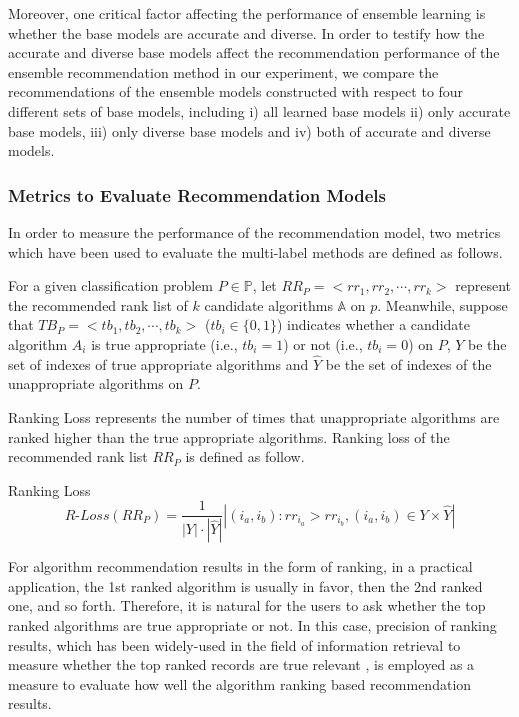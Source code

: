 \documentclass[acmsmall]{acmart}
\begin{document}
Moreover, one critical factor affecting the performance of ensemble
learning is whether the base models are accurate and diverse. In
order to testify how the accurate and diverse base models affect the
recommendation performance of the ensemble recommendation method in
our experiment, we compare the recommendations of the ensemble
models constructed with respect to four different sets of base
models, including i) all learned base models ii) only accurate base
models, iii) only diverse base models and iv) both of accurate and
diverse models.

\subsubsection{Metrics to Evaluate Recommendation
	Models}\label{subsec:evaluateMetrics}

In order to measure the performance of the recommendation model, two
metrics which have been used to evaluate the multi-label methods are
defined as follows.

For a given classification problem $P \in \mathbb{P}$, let $RR_{P} =
<rr_1, rr_2, \cdots, rr_k>$ represent the recommended rank list of
$k$ candidate algorithms $\mathbb{A}$ on $p$. Meanwhile, suppose
that $TB_{P} = <tb_1, tb_2, \cdots, tb_k>$ ($tb_{i} \in \{0, 1\}$)
indicates whether a candidate algorithm $A_i$ is true appropriate
(i.e., $tb_i = 1$) or not (i.e., $tb_i = 0$) on $P$, $Y$ be the set
of indexes of true appropriate algorithms and $\hat{Y}$ be the set
of indexes of the unappropriate algorithms on $P$.

Ranking Loss represents the number of times that unappropriate
algorithms are ranked higher than the true appropriate algorithms.
Ranking loss of the recommended rank list $RR_{P}$ is defined as
follow.

\begin{definition} Ranking Loss \label{def:rankingLoss}
	\begin{equation}
	R\text{-}Loss(RR_{P}) = \frac{1}{|Y|\cdot |\hat{Y}|}|(i_a, i_b): rr_{i_a} > rr_{i_b},(i_a, i_b) \in Y\times\hat{Y}|
	\end{equation}
\end{definition}

For algorithm recommendation results in the form of ranking, in a
practical application, the 1st ranked algorithm is usually in favor,
then the 2nd ranked one, and so forth. Therefore, it is natural for
the users to ask whether the top ranked algorithms are true
appropriate or not. In this case, precision of ranking results,
which has been widely-used in the field of information retrieval to
measure whether the top ranked records are true relevant
\cite{baeza1999modern}, is employed as a measure to evaluate how
well the algorithm ranking based recommendation results.
\end{document}
